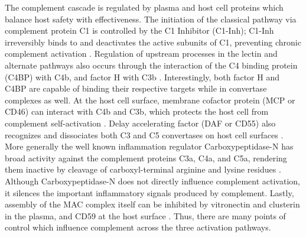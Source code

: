 \documentclass[12pt]{article}
\begin{document}
The complement cascade is regulated by plasma and host cell proteins which balance host safety with effectiveness.
The initiation of the classical pathway via complement protein C1 is controlled by the C1 Inhibitor (C1-Inh);
C1-Inh irreversibly binds to and deactivates the active subunits of C1, preventing chronic complement activation \cite{walker1995complement}.
Regulation of upstream processes in the lectin and alternate pathways also occurs through the interaction of the C4 binding protein (C4BP) with C4b, and factor H with C3b \cite{blom2001structural}. Interestingly,
both factor H and C4BP are capable of binding their respective targets while in convertase complexes as well.
At the host cell surface, membrane cofactor protein (MCP or CD46) can interact with C4b and C3b, which protects the host cell from complement self-activation \cite{riley2004cd46}.
Delay accelerating factor (DAF or CD55) also recognizes and dissociates both C3 and C5 convertases on host cell surfaces \cite{lukacik2004complement}.
More generally the well known inflammation regulator Carboxypeptidase-N has broad activity against the complement proteins C3a, C4a, and C5a, rendering them inactive by cleavage of carboxyl-terminal arginine and lysine residues \cite{liszewski1995control}.
Although Carboxypeptidase-N does not directly influence complement activation, it silences the important inflammatory signals produced by complement.
Lastly, assembly of the MAC complex itself can be inhibited by vitronectin and clusterin in the plasma, and CD59 at the host surface \cite{chauhan2006presence,zewde2016quantitative}.
Thus, there are many points of control which influence complement across the three activation pathways.
\end{document}
